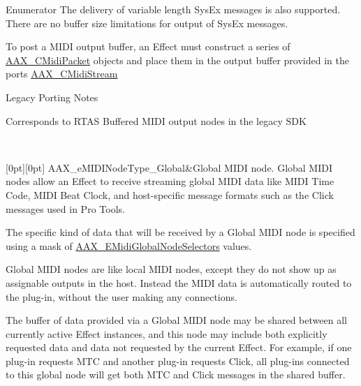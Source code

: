 \begin{DoxyEnumFields}{Enumerator}
The delivery of variable length Sys\+Ex messages is also supported. There are no buffer size limitations for output of Sys\+Ex messages.

To post a M\+I\+DI output buffer, an Effect must construct a series of \mbox{\hyperlink{a01429}{A\+A\+X\+\_\+\+C\+Midi\+Packet}} objects and place them in the output buffer provided in the port\textquotesingle{}s \mbox{\hyperlink{a01433}{A\+A\+X\+\_\+\+C\+Midi\+Stream}}

\begin{DoxyRefDesc}{Legacy Porting Notes}
\item[\mbox{\hyperlink{a00787__porting_notes000028}{Legacy Porting Notes}}]Corresponds to R\+T\+AS Buffered M\+I\+DI output nodes in the legacy S\+DK \end{DoxyRefDesc}
\\
\hline

[0pt][0pt]{}\mbox{\label{a00491_a5e1dffce35d05990dbbad651702678e4a2be91828f8c1dac20ab5dff136fc1fce}} 
A\+A\+X\+\_\+e\+M\+I\+D\+I\+Node\+Type\+\_\+\+Global&Global M\+I\+DI node. Global M\+I\+DI nodes allow an Effect to receive streaming global M\+I\+DI data like M\+I\+DI Time Code, M\+I\+DI Beat Clock, and host-\/specific message formats such as the Click messages used in Pro Tools.

The specific kind of data that will be received by a Global M\+I\+DI node is specified using a mask of \mbox{\hyperlink{a00491_a349dae6bc64bda67a5440cbc6637f92d}{A\+A\+X\+\_\+\+E\+Midi\+Global\+Node\+Selectors}} values.

Global M\+I\+DI nodes are like local M\+I\+DI nodes, except they do not show up as assignable outputs in the host. Instead the M\+I\+DI data is automatically routed to the plug-\/in, without the user making any connections.

The buffer of data provided via a Global M\+I\+DI node may be shared between all currently active Effect instances, and this node may include both explicitly requested data and data not requested by the current Effect. For example, if one plug-\/in requests M\+TC and another plug-\/in requests Click, all plug-\/ins connected to this global node will get both M\+TC and Click messages in the shared buffer.


\end{DoxyEnumFields}
